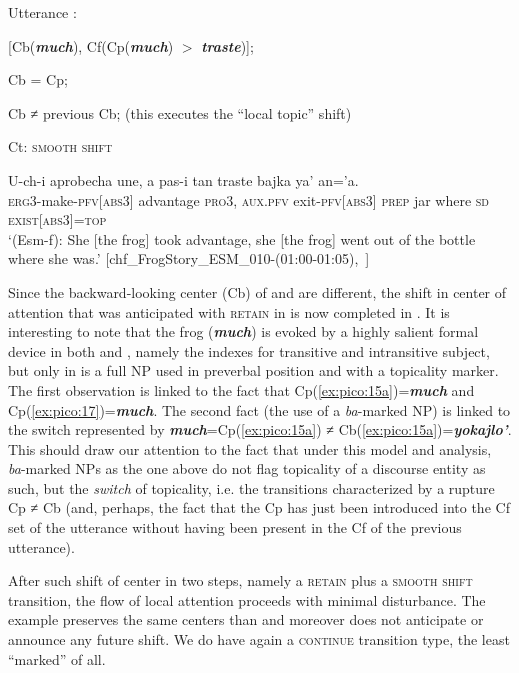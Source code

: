 \documentclass[output=paper
,modfonts
,nonflat]{langsci/langscibook}
\begin{document}
\ea
Utterance :

[Cb(\textbf{\textit{much}}), Cf(Cp(\textbf{\textit{much}}) $>$ \textbf{\textit{traste}})];

Cb = Cp;

Cb ≠ previous Cb;  (this executes the ``local topic'' shift)

Ct: \textsc{smooth shift}
\z


\ea \label{ex:pico:17}

\gll   U-ch-i aprobecha une, a pas-i tan traste bajka ya' an='a.\\
{\textsc{erg3}}-make-{\textsc{pfv[abs3]}} advantage {\textsc{pro3}},  {\textsc{aux.pfv}} exit-{\textsc{pfv[abs3]}} {\textsc{prep}} {jar} {where} {\textsc{sd}} \textsc{exist[abs3]}={\textsc{top}}  \\

\glt `(Esm-f): She [the frog] took advantage, she [the frog] went out of the bottle where she was.' [chf\_FrogStory\_ESM\_010-(01:00-01:05),~\citealt{Delgado-Galvan2018archive}]
\z

Since the backward-looking center (Cb) of  and  are different, the shift in center of attention that was anticipated with \textsc{retain} in  is now completed in . It is interesting to note that the frog (\textbf{\textit{much}}) is evoked by a highly salient formal device in both  and , namely the indexes for transitive and intransitive subject, but only in  is a full NP used in preverbal position and with a topicality marker. The first observation is linked to the fact that Cp(\ref{ex:pico:15a})=\textbf{\textit{much}} and Cp(\ref{ex:pico:17})=\textbf{\textit{much}}. The second fact (the use of a \textit{ba}-marked NP) is linked to the switch represented by \textbf{\textit{much}}=Cp(\ref{ex:pico:15a}) ≠ Cb(\ref{ex:pico:15a})=\textbf{\textit{yokajlo'}}. This should draw our attention to the fact that under this model and analysis, \textit{ba}-marked NPs as the one above do not flag topicality of a discourse entity as such, but the \textit{switch} of topicality, i.e. the transitions characterized by a rupture Cp ≠ Cb (and, perhaps, the fact that the Cp has just been  introduced into the Cf set of the utterance without having been present in the Cf of the previous utterance). 

After such shift of center in two steps, namely a \textsc{retain}  plus a \textsc{smooth shift}  transition, the flow of local attention proceeds with minimal disturbance. The example  preserves the same centers than  and moreover does not anticipate or announce any future shift. We do have again a \textsc{continue} transition type, the least ``marked'' of all.
\end{document}
